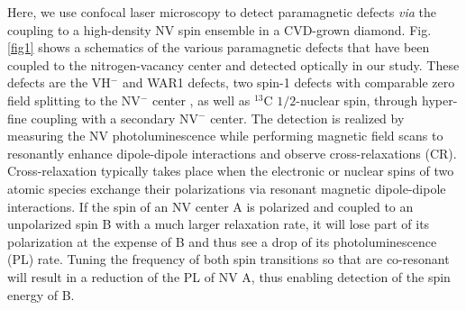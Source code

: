 \documentclass[9pt,twocolumn,twoside]{revtex4-1}
\begin{document}

Here, we use confocal laser microscopy to detect paramagnetic defects {\it via} the coupling to a high-density NV spin ensemble in a CVD-grown diamond.
Fig. \ref{fig1} shows a schematics of the various paramagnetic defects that have been coupled to the nitrogen-vacancy center and detected optically in our study. These defects are the VH$^-$ and WAR1 defects, two spin-1 defects with comparable zero field splitting to the NV$^-$ center \citep{glover_hydrogen_2004, cruddace2007magnetic}, as well as $^{13}$C $1/2$-nuclear spin, through hyper-fine coupling with a secondary NV$^-$ center.
The detection is realized by measuring the NV photoluminescence while performing magnetic field scans to resonantly enhance dipole-dipole interactions and observe cross-relaxations (CR).
Cross-relaxation typically takes place when the electronic or nuclear spins of two atomic species exchange their polarizations via resonant magnetic dipole-dipole interactions. 
If the spin of an NV center A is polarized and coupled to an unpolarized spin B with a much larger relaxation rate, it will lose part of its polarization at the expense of B and thus see a drop of its photoluminescence (PL) rate. 
Tuning the frequency of both spin transitions so that are co-resonant will result in a reduction of the PL of NV A, thus enabling detection of the spin energy of B.
\end{document}
